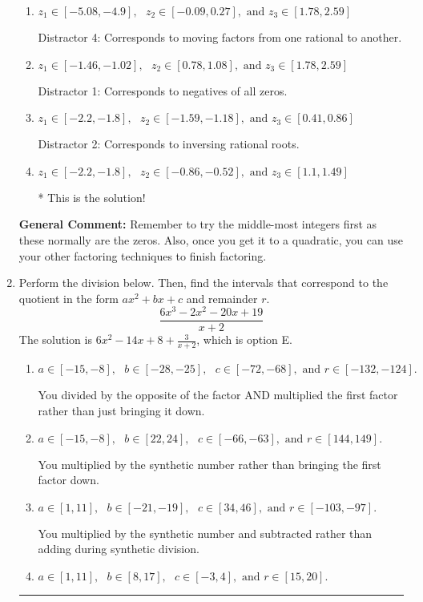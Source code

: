 \documentclass{extbook}[14pt]
\newcommand{\litem}[1]{\item #1

\rule{\textwidth}{0.4pt}}
\begin{document}
\begin{enumerate}
{\begin{enumerate}[label=\Alph*.]
 Distractor 3: Corresponds to negatives of all zeros AND inversing rational roots.
\item \( z_1 \in [-5.08, -4.9], \text{   }  z_2 \in [-0.09, 0.27], \text{   and   } z_3 \in [1.78, 2.59] \)

 Distractor 4: Corresponds to moving factors from one rational to another.
\item \( z_1 \in [-1.46, -1.02], \text{   }  z_2 \in [0.78, 1.08], \text{   and   } z_3 \in [1.78, 2.59] \)

 Distractor 1: Corresponds to negatives of all zeros.
\item \( z_1 \in [-2.2, -1.8], \text{   }  z_2 \in [-1.59, -1.18], \text{   and   } z_3 \in [0.41, 0.86] \)

 Distractor 2: Corresponds to inversing rational roots.
\item \( z_1 \in [-2.2, -1.8], \text{   }  z_2 \in [-0.86, -0.52], \text{   and   } z_3 \in [1.1, 1.49] \)

* This is the solution!
\end{enumerate}

\textbf{General Comment:} Remember to try the middle-most integers first as these normally are the zeros. Also, once you get it to a quadratic, you can use your other factoring techniques to finish factoring.
}
\litem{
Perform the division below. Then, find the intervals that correspond to the quotient in the form $ax^2+bx+c$ and remainder $r$.
\[ \frac{6x^{3} -2 x^{2} -20 x + 19}{x + 2} \]The solution is \( 6x^{2} -14 x + 8 + \frac{3}{x + 2} \), which is option E.\begin{enumerate}[label=\Alph*.]
\item \( a \in [-15, -8], \text{   } b \in [-28, -25], \text{   } c \in [-72, -68], \text{   and   } r \in [-132, -124]. \)

 You divided by the opposite of the factor AND multiplied the first factor rather than just bringing it down.
\item \( a \in [-15, -8], \text{   } b \in [22, 24], \text{   } c \in [-66, -63], \text{   and   } r \in [144, 149]. \)

 You multiplied by the synthetic number rather than bringing the first factor down.
\item \( a \in [1, 11], \text{   } b \in [-21, -19], \text{   } c \in [34, 46], \text{   and   } r \in [-103, -97]. \)

 You multiplied by the synthetic number and subtracted rather than adding during synthetic division.
\item \( a \in [1, 11], \text{   } b \in [8, 17], \text{   } c \in [-3, 4], \text{   and   } r \in [15, 20]. \)


\end{enumerate}}
\end{enumerate}
\end{document}
